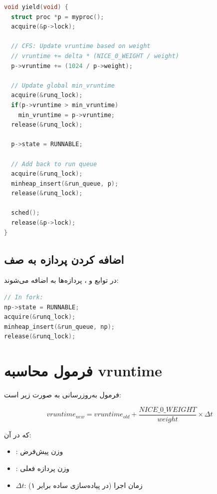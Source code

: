 \documentclass[12pt,a4paper]{article}
\begin{document}
\begin{latin}
\begin{lstlisting}[language=C, caption={به‌روزرسانی vruntime در yield}]
void yield(void) {
  struct proc *p = myproc();
  acquire(&p->lock);
  
  // CFS: Update vruntime based on weight
  // vruntime += delta * (NICE_0_WEIGHT / weight)
  p->vruntime += (1024 / p->weight);
  
  // Update global min_vruntime
  acquire(&runq_lock);
  if(p->vruntime > min_vruntime)
    min_vruntime = p->vruntime;
  release(&runq_lock);
  
  p->state = RUNNABLE;
  
  // Add back to run queue
  acquire(&runq_lock);
  minheap_insert(&run_queue, p);
  release(&runq_lock);
  
  sched();
  release(&p->lock);
}
\end{lstlisting}
\end{latin}

\subsection{اضافه کردن پردازه به صف }
در توابع  و ، پردازه‌ها به  اضافه می‌شوند:

\begin{latin}
\begin{lstlisting}[language=C, caption={اضافه کردن به صف اجرا}]
// In fork:
np->state = RUNNABLE;
acquire(&runq_lock);
minheap_insert(&run_queue, np);
release(&runq_lock);
\end{lstlisting}
\end{latin}

\section{فرمول محاسبه vruntime}
فرمول به‌روزرسانی  به صورت زیر است:

\begin{equation}
vruntime_{new} = vruntime_{old} + \frac{NICE\_0\_WEIGHT}{weight} \times \Delta t
\end{equation}

که در آن:
\begin{itemize}
    \item {}: وزن پیش‌فرض
    \item {}: وزن پردازه فعلی
    \item $\Delta t$: زمان اجرا (در پیاده‌سازی ساده برابر ۱)
\end{itemize}
\end{document}
